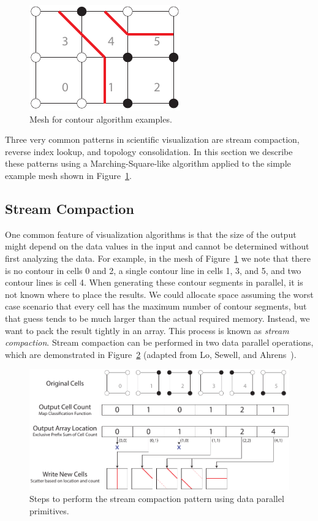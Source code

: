 \documentclass{superfri}
\newcommand*{\scite}[1]{~\cite{#1}}
\newcommand*{\keyterm}[1]{\emph{#1}}
\begin{document}
\begin{figure}
  \vspace{-\baselineskip}
  \includegraphics{images/ExampleMesh}
  \caption{Mesh for contour algorithm examples.}
  \label{fig:ExampleMesh}
  \vspace{-\baselineskip}
\end{figure}

Three very common patterns in scientific visualization are stream
compaction, reverse index lookup, and topology consolidation. In this
section we describe these patterns using a Marching-Square-like algorithm
applied to the simple example mesh shown in Figure~\ref{fig:ExampleMesh}.

\subsection{Stream Compaction}

\noindent
One common feature of visualization algorithms is that the size of the
output might depend on the data values in the input and cannot be
determined without first analyzing the data. For example, in the mesh of
Figure~\ref{fig:ExampleMesh} we note that there is no contour in cells 0
and 2, a single contour line in cells 1, 3, and 5, and two contour lines is
cell 4. When generating these contour segments in parallel, it is not known
where to place the results. We could allocate space assuming the worst case
scenario that every cell has the maximum number of contour segments, but
that guess tends to be much larger than the actual required memory.
Instead, we want to pack the result tightly in an array. This process is
known as \keyterm{stream compaction}. Stream compaction can be performed in
two data parallel operations, which are demonstrated in
Figure~\ref{fig:StreamCompaction} (adapted from Lo, Sewell, and
Ahrens\scite{PISTON}).

\begin{figure}[htb]
  \centering
  \includegraphics{images/StreamCompaction}
  \caption{Steps to perform the stream compaction pattern using data
    parallel primitives.}
  \label{fig:StreamCompaction}
\end{figure}
\end{document}
